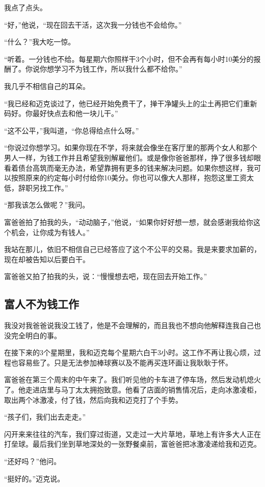 我点了点头。

“好，”他说，“现在回去干活，这次我一分钱也不会给你。”

“什么？”我大吃一惊。

“听着。一分钱也不给。每星期六你照样干3个小时，但不会再有每小时10美分的报酬了。你说你想学习不为钱工作，所以我什么都不给你。”

我几乎不相信自己的耳朵。

“我已经和迈克谈过了，他已经开始免费干了，掸干净罐头上的尘土再把它们重新码好。你最好快点去和他一块儿干。”

“这不公平，”我叫道，“你总得给点什么呀。”

“你说过你想学习。如果你现在不学，将来就会像坐在客厅里的那两个女人和那个男人一样，为钱工作并且希望我别解雇他们。或是像你爸爸那样，挣了很多钱却眼看着债台高筑而毫无办法，希望靠拥有更多的钱来解决问题。如果你想这样，我可以按照原来的约定每小时付给你10美分。你也可以像大人那样，抱怨这里工资太低，辞职另找工作。”

“那我该怎么做呢？”我问。

富爸爸拍了拍我的头，“动动脑子，”他说，“如果你好好想一想，就会感谢我给你这个机会，让你成为有钱人。”

我站在那儿，依旧不相信自己已经答应了这个不公平的交易。我是来要求加薪的，现在却被告知以后要白干。

富爸爸又拍了拍我的头，说：“慢慢想去吧，现在回去开始工作。”

\subsection*{富人不为钱工作}

我没对我爸爸说我没工钱了，他是不会理解的，而且我也不想向他解释连我自己也没完全明白的事。

在接下来的3个星期里，我和迈克每个星期六白干3小时。这工作不再让我心烦，过程也容易些了。只是无法参加棒球赛以及不能再买连环画让我耿耿于怀。

富爸爸在第三个周末的中午来了。我们听见他的卡车进了停车场，然后发动机熄火了。他走进店里与马丁太太拥抱致意。他看了店面的销售情况后，走向冰激凌柜，取出两个冰激凌，付了钱，然后向我和迈克打了个手势。

“孩子们，我们出去走走。”

闪开来来往往的汽车，我们穿过街道，又走过一大片草地，草地上有许多大人正在打垒球。最后我们坐到草地深处的一张野餐桌前，富爸爸把冰激凌递给我和迈克。

“还好吗？”他问。

“挺好的。”迈克说。

